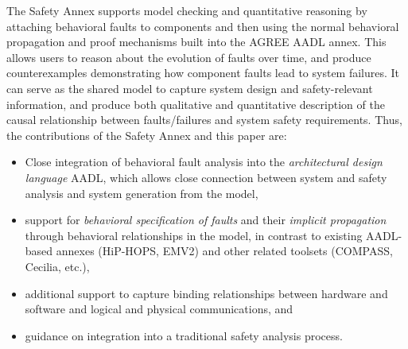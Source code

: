 The Safety Annex supports model checking and quantitative reasoning by attaching behavioral faults to components and then using the normal behavioral propagation and proof mechanisms built into the AGREE AADL annex. This allows users to reason about the evolution of faults over time, and produce counterexamples demonstrating how component faults lead to system failures. It can serve as the shared model to capture system design and safety-relevant information, and produce both qualitative and quantitative description of the causal relationship between faults/failures and system safety requirements.
%
Thus, the contributions of the Safety Annex and this paper are:
\begin{itemize}
\item Close integration of behavioral fault analysis into the {\em architectural design language} AADL, which allows close connection between system and safety analysis and system generation from the model,
\item support for {\em behavioral specification of faults} and their {\em implicit propagation} through behavioral relationships in the model, in contrast to existing AADL-based annexes (HiP-HOPS, EMV2) and other related toolsets (COMPASS, Cecilia, etc.),
\item additional support to capture binding relationships between hardware and software and logical and physical communications, and
\item guidance on integration into a traditional safety analysis process.
\end{itemize}
